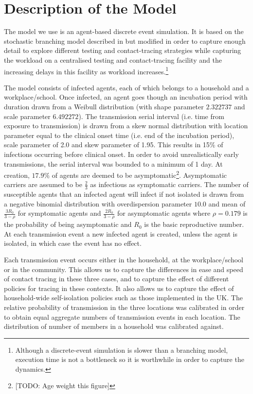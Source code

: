 \documentclass{article}
\begin{document}
\section{Description of the Model}

The model we use is an agent-based discrete event simulation. It is based on the stochastic branching model described in \cite{hellewellfeasibility} but modified in order to capture enough detail to explore different testing and contact-tracing strategies while capturing the workload on a centralised testing and contact-tracing facility and the increasing delays in this facility as workload increases.\footnote{Although a discrete-event simulation is slower than a branching model, execution time is not a bottleneck so it is worthwhile in order to capture the dynamics.}

The model consists of infected agents, each of which belongs to a household and a workplace/school. Once infected, an agent goes though an incubation period with duration drawn from a Weibull distribution (with shape parameter $2.322737$ and scale parameter $6.492272$)\cite{backer2020incubation}. The transmission serial interval (i.e. time from exposure to transmission) is drawn from a skew normal distribution with location parameter equal to the clinical onset time (i.e. end of the incubation period), scale parameter of 2.0 and skew parameter of 1.95\cite{hellewellfeasibility}. This results in 15\% of infections occurring before clinical onset\cite{hellewellfeasibility}. In order to avoid unrealistically early transmissions, the serial interval was bounded to a minimum of 1 day. At creation, $17.9\%$ of agents are deemed to be asymptomatic\cite{:/content/10.2807/1560-7917.ES.2020.25.10.2000180}\footnote{[TODO: Age weight this figure]}. Asymptomatic carriers are assumed to be $\frac{2}{3}$ as infectious as symptomatic carriers\cite{ferguson2020impact}. The number of susceptible agents that an infected agent will infect if not isolated is drawn from a negative binomial distribution with overdispersion parameter $10.0$\cite{zhuang2020preliminary}\cite{riou2020pattern} and mean of $\frac{3R_0}{3 - \rho}$ for symptomatic agents and $\frac{2R_0}{3 - \rho}$ for asymptomatic agents where $\rho=0.179$ is the probability of being asymptomatic and $R_0$ is the basic reproductive number. At each transmission event a new infected agent is created, unless the agent is isolated, in which case the event has no effect.

Each transmission event occurs either in the household, at the workplace/school or in the community. This allows us to capture the differences in ease and speed of contact tracing in these three cases, and to capture the effect of different policies for tracing in these contexts. It also allows us to capture the effect of household-wide self-isolation policies such as those implemented in the UK. The relative probability of transmission in the three locations was calibrated in order to obtain equal aggregate numbers of transmission events in each location\cite{ferguson2020impact}. The distribution of number of members in a household was calibrated against\cite{smithHouseholds}.
\end{document}
